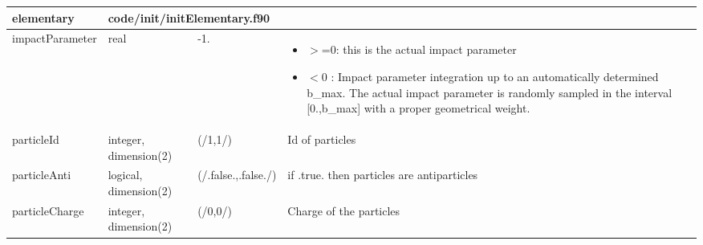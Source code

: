\documentclass{article}
\begin{document}

\begin{longtable}{llll}
\toprule
\textbf{\large{elementary}} & \multicolumn{3}{l}{\footnotesize{code/init/initElementary.f90}}\\*
\midrule
\endfirsthead
\midrule
\endhead
impactParameter & \begin{minipage}[t]{2cm}real\end{minipage} & \begin{minipage}[t]{2cm}-1.\end{minipage} & \begin{minipage}[t]{12cm}\begin{itemize}\leftmargin0em\itemindent0pt\item $>$=0: this is the actual impact parameter\item $<$0 : Impact parameter integration up to an automatically determined b\_max.   The actual impact parameter is randomly sampled in the interval   [0.,b\_max] with a proper geometrical weight.\end{itemize}\end{minipage}\\*
\midrule
particleId & \begin{minipage}[t]{2cm}integer, dimension(2)\end{minipage} & \begin{minipage}[t]{2cm}(/1,1/)\end{minipage} & \begin{minipage}[t]{12cm}Id of particles\end{minipage}\\*
\midrule
particleAnti & \begin{minipage}[t]{2cm}logical, dimension(2)\end{minipage} & \begin{minipage}[t]{2cm}(/.false.,.false./)\end{minipage} & \begin{minipage}[t]{12cm}if .true. then particles are antiparticles\end{minipage}\\*
\midrule
particleCharge & \begin{minipage}[t]{2cm}integer, dimension(2)\end{minipage} & \begin{minipage}[t]{2cm}(/0,0/)\end{minipage} & \begin{minipage}[t]{12cm}Charge of the particles\end{minipage}\\*

\end{longtable}
\end{document}
